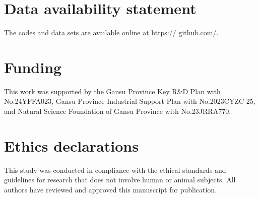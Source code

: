 \documentclass[lettersize,journal]{IEEEtran}
\begin{document}
\section*{\textbf{Data availability statement}}
The codes and data sets are available online at https:// github.com/.


\section*{\textbf{Funding}}
This work was supported by the Gansu Province Key R\&D  Plan with No.24YFFA023, Gansu Province Industrial Support Plan with No.2023CYZC-25,  and  Natural Science Foundation of Gansu Province with No.23JRRA770.   

\section*{\textbf{Ethics declarations}}
This study was conducted in compliance with the ethical standards and guidelines for research that does not involve human or animal subjects. All authors have reviewed and approved this manuscript for publication.

%

\end{document}
